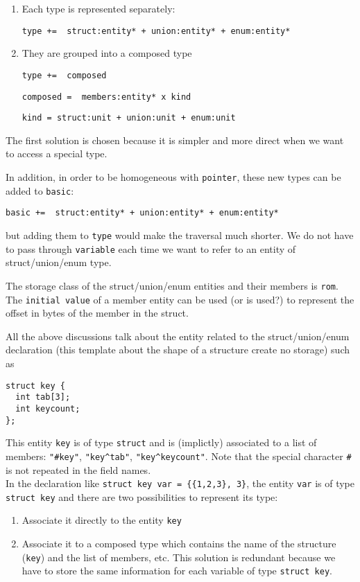 \documentclass[a4paper]{report}
\begin{document}
\begin{enumerate}
\item Each type is represented separately:

\verb/type +=  struct:entity* + union:entity* + enum:entity*/ 
\item They are grouped into a composed type

\verb/type +=  composed/ 

\verb/composed =  members:entity* x kind/

\verb/kind = struct:unit + union:unit + enum:unit/
\end{enumerate}
The first solution is chosen because it is simpler and more direct when
we want to access a special type. 

In addition, in order to be homogeneous with \verb/pointer/, these
new types can be added to \verb/basic/:

\verb/basic +=  struct:entity* + union:entity* + enum:entity*/ 

\noindent
but adding them to \verb/type/ would make the traversal much
 shorter. We do not have to pass through \verb/variable/ each time we
 want to refer to an entity of struct/union/enum type.

The storage class of the struct/union/enum entities and their members
 is \verb/rom/. The \verb/initial value/ of a member entity can be
 used (or is used?) to represent the offset in bytes of the member in
 the struct.

All the above discussions talk about the entity related to the
struct/union/enum declaration (this template about the shape of a
structure create no storage) such as 
\begin{lstlisting}
struct key {
  int tab[3];
  int keycount;
};
\end{lstlisting}

This entity \verb/key/ is of type \verb/struct/ and is (implictly)
 associated to a list of members: \lstinline/"#key"/,
 \lstinline/"key^tab"/, \lstinline/"key^keycount"/. Note that the special
 character \lstinline/#/ is not repeated in the field names.\\

In the declaration like \lstinline/struct key var = {{1,2,3}, 3}/, the
 entity \verb/var/ is of type \lstinline/struct key/ and there are two
 possibilities to represent its type:

\begin{enumerate}
\item Associate it directly  to the entity \verb/key/
\item Associate it to a composed type which contains the name of the
 structure (\verb/key/) and the list of members, etc. This solution is
 redundant because we have to store the same information for each
 variable of type \lstinline/struct key/.
\end{enumerate}
\end{document}
